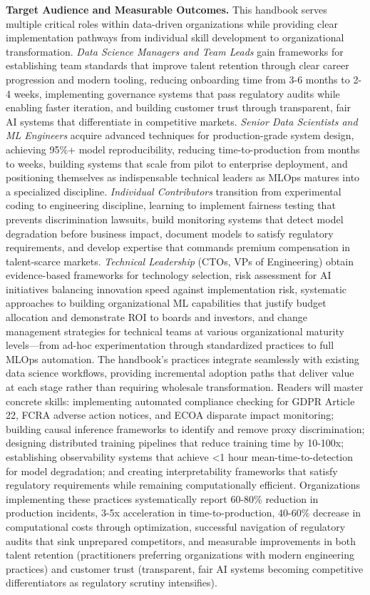 \documentclass[11pt]{book}
\begin{document}
\textbf{Target Audience and Measurable Outcomes.} This handbook serves multiple critical roles within data-driven organizations while providing clear implementation pathways from individual skill development to organizational transformation. \textit{Data Science Managers and Team Leads} gain frameworks for establishing team standards that improve talent retention through clear career progression and modern tooling, reducing onboarding time from 3-6 months to 2-4 weeks, implementing governance systems that pass regulatory audits while enabling faster iteration, and building customer trust through transparent, fair AI systems that differentiate in competitive markets. \textit{Senior Data Scientists and ML Engineers} acquire advanced techniques for production-grade system design, achieving 95\%+ model reproducibility, reducing time-to-production from months to weeks, building systems that scale from pilot to enterprise deployment, and positioning themselves as indispensable technical leaders as MLOps matures into a specialized discipline. \textit{Individual Contributors} transition from experimental coding to engineering discipline, learning to implement fairness testing that prevents discrimination lawsuits, build monitoring systems that detect model degradation before business impact, document models to satisfy regulatory requirements, and develop expertise that commands premium compensation in talent-scarce markets. \textit{Technical Leadership} (CTOs, VPs of Engineering) obtain evidence-based frameworks for technology selection, risk assessment for AI initiatives balancing innovation speed against implementation risk, systematic approaches to building organizational ML capabilities that justify budget allocation and demonstrate ROI to boards and investors, and change management strategies for technical teams at various organizational maturity levels—from ad-hoc experimentation through standardized practices to full MLOps automation. The handbook's practices integrate seamlessly with existing data science workflows, providing incremental adoption paths that deliver value at each stage rather than requiring wholesale transformation. Readers will master concrete skills: implementing automated compliance checking for GDPR Article 22, FCRA adverse action notices, and ECOA disparate impact monitoring; building causal inference frameworks to identify and remove proxy discrimination; designing distributed training pipelines that reduce training time by 10-100x; establishing observability systems that achieve <1 hour mean-time-to-detection for model degradation; and creating interpretability frameworks that satisfy regulatory requirements while remaining computationally efficient. Organizations implementing these practices systematically report 60-80\% reduction in production incidents, 3-5x acceleration in time-to-production, 40-60\% decrease in computational costs through optimization, successful navigation of regulatory audits that sink unprepared competitors, and measurable improvements in both talent retention (practitioners preferring organizations with modern engineering practices) and customer trust (transparent, fair AI systems becoming competitive differentiators as regulatory scrutiny intensifies).
\end{document}
